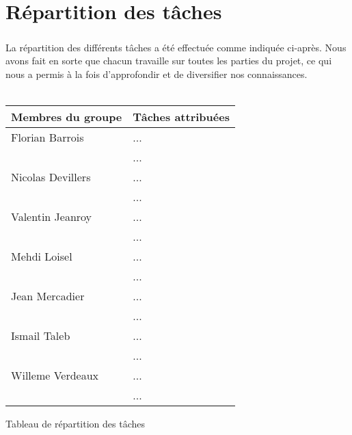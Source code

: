 \documentclass[a4paper,10pt]{report}
\begin{document}
  \chapter{Répartition des tâches}
    \paragraph{}
      La répartition des différents tâches a été effectuée comme indiquée ci-après.
      Nous avons fait en sorte que chacun travaille sur toutes les parties du projet, ce qui nous a permis à la fois d'approfondir et de diversifier nos connaissances.
      ~\\
      ~\\
      \begin{center}
	\begin{tabular}{|l|l|}
	  \hline
	  Membres du groupe & Tâches attribuées \\
	  \hline
	    Florian Barrois & ... \\
	    & ... \\
	  \hline
	    Nicolas Devillers & ... \\
	    & ...\\
	    \hline
	    Valentin Jeanroy & ... \\
	    & ...\\
	    \hline
	    Mehdi Loisel & ... \\
	    & ...\\
	    \hline
	    Jean Mercadier & ... \\
	    & ...\\
	    \hline
	    Ismail Taleb & ... \\
	    & ...\\
	    \hline
	    Willeme Verdeaux & ... \\
	    & ...\\
	  \hline
	\end{tabular}
	
	Tableau de répartition des tâches
      \end{center}
      
      
\end{document}

